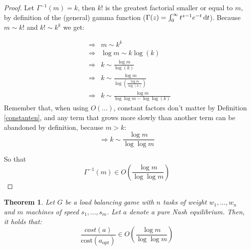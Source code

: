 \documentclass[a4paper,11pt]{article}
\newtheorem{theorem}{Theorem}[section]
\newcommand{\cost}{\text{cost}}
\newcommand{\opt}{\text{opt}}
\begin{document}
\begin{proof}
Let $\Gamma^{-1}(m) = k$, then $k!$ is the greatest factorial smaller or equal to $m$, by definition of the (general) gamma function ($\Gamma(z) = \int_0^\infty  t^{z-1} e^{-t}\,{\rm d}t$). Because $m \sim k!$ and $k! \sim k^k$ we get:

\begin{eqnarray*}
&\Rightarrow& m \sim k^{k} \\
&\Rightarrow& \log m \sim k\log(k) \\
&\Rightarrow& k \sim \frac{\log m}{\log(k)}\\
&\Rightarrow& k \sim \frac{\log m}{\log(\frac{\log m}{\log (k)})}\\
&\Rightarrow& k \sim \frac{\log m}{\log\log m - \log\log (k)}
\end{eqnarray*}
Remember that, when using $O(...)$, constant factors don't matter by Definition \ref{constanten}, and any term that grows more slowly than another term can be abandoned by definition, because $m > k$:
$$\Rightarrow k \sim \frac{\log m}{\log \log m}$$

So that
$$\Gamma^{-1}(m) \in O\left(\frac{\log m}{\log \log m}\right)$$
\end{proof}

\begin{theorem}\label{puur}
Let $G$ be a load balancing game with $n$ tasks of weight $w_1,...,w_n$ and $m$ machines of speed $s_1, ..., s_m$. Let $a$ denote a pure Nash equilibrium. Then, it holds that:
$$\frac{cost(a)}{\cost(a_{\opt})} \in O\left(\frac{\log m}{\log \log m}\right)$$
\end{theorem}
\end{document}
